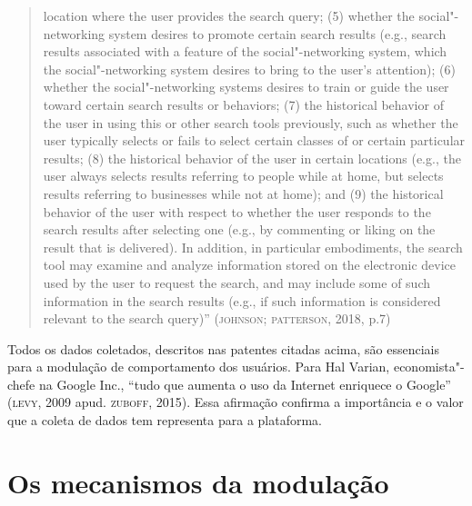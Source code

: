 \begin{quote}
{  location where the user provides the search query; (5) whether the
  social"-networking system desires to promote certain search results
  (e.g., search results associated with a feature of the
  social"-networking system, which the social"-networking system desires
  to bring to the user's attention); (6) whether the social"-networking
  systems desires to train or guide the user toward certain search
  results or behaviors; (7) the historical behavior of the user in using
  this or other search tools previously, such as whether the user
  typically selects or fails to select certain classes of or certain
  particular results; (8) the historical behavior of the user in certain
  locations (e.g., the user always selects results referring to people
  while at home, but selects results referring to businesses while not
  at home); and (9) the historical behavior of the user with respect to
  whether the user responds to the search results after selecting one
  (e.g., by commenting or liking on the result that is delivered). In
  addition, in particular embodiments, the search tool may examine and
  analyze information stored on the electronic device used by the user
  to request the search, and may include some of such information in the
  search results (e.g., if such information is considered relevant to
  the search query)''} (\textsc{johnson; patterson}, 2018, p.7)
\end{quote}

Todos os dados coletados, descritos nas patentes citadas acima, são
essenciais para a modulação de comportamento dos usuários. Para Hal
Varian, economista"-chefe na Google Inc., ``tudo que aumenta o uso da
Internet enriquece o Google'' (\textsc{levy}, 2009 apud. \textsc{zuboff}, 2015). Essa
afirmação confirma a importância e o valor que a coleta de dados tem
representa para a plataforma.

\section{Os mecanismos da modulação}

